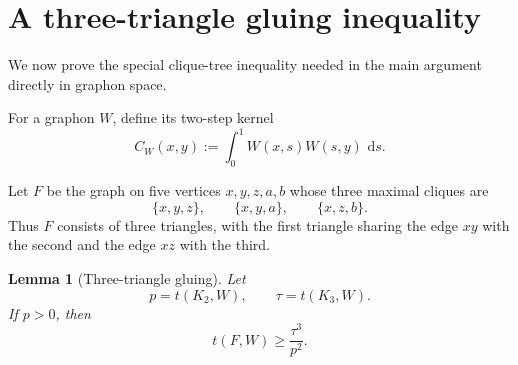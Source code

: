 \documentclass[11pt]{article}
\newtheorem{lemma}[theorem]{Lemma}
\newcommand{\dd}{\,\mathrm{d}}
\begin{document}
\section{A three-triangle gluing inequality}

We now prove the special clique-tree inequality needed in the main
argument directly in graphon space.

For a graphon \(W\), define its two-step kernel
\[
C_W(x,y)
:=
\int_0^1W(x,s)W(s,y)\,\dd s.
\]

Let \(F\) be the graph on five vertices \(x,y,z,a,b\) whose three maximal
cliques are
\[
\{x,y,z\},\qquad
\{x,y,a\},\qquad
\{x,z,b\}.
\]
Thus \(F\) consists of three triangles, with the first triangle sharing
the edge \(xy\) with the second and the edge \(xz\) with the third.

\begin{lemma}[Three-triangle gluing]\label{lem:triangle-tree}
Let
\[
p=t(K_2,W),
\qquad
\tau=t(K_3,W).
\]
If \(p>0\), then
\[
\boxed{
t(F,W)\ge\frac{\tau^3}{p^2}.
}
\]
\end{lemma}
\end{document}
